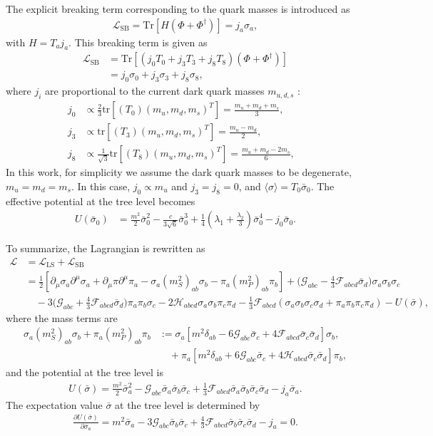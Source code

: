 \documentclass[a4paper,preprint,superscriptaddress,preprintnumbers,nofootinbib]{revtex4}
\newcommand{\al}[1]{\begin{align}#1\end{align}}
\newcommand{\nn}{\nonumber\\}
\newcommand{\p}{\partial}
\newcommand{\fn}[1]{\!\left(#1\right)}
\newcommand{\bra}{\langle}
\newcommand{\ket}{\rangle}
\newcommand{\Lag}{\mathcal L}
\newcommand{\tr}{\text{tr}}
\begin{document}
\begin{appendix}
The explicit breaking term corresponding to the quark masses is introduced as
\al{
\Lag_\text{SB} = \text{Tr}[H(\Phi +\Phi^\dagger)]=j_a\sigma_a,
}
with $H=T_a j_a$.
This breaking term is given as
\al{
\Lag_\text{SB} &= \text{Tr}\left[ \left(j_0T_0+j_3 T_3+j_8T_8 \right)\left(\Phi+\Phi^\dagger\right)\right]\nn
&=j_0\sigma_0+j_3\sigma_3+j_8\sigma_8,
}
where $j_i$ are proportional to the current dark quark masses $m_{u,d,s}$ :
\al{
j_0 &\propto \frac{2}{3}\tr[(T_0)(m_u, m_d, m_s)^T]=\frac{m_u+m_d+m_s}{3},&\\
j_3 &\propto \tr[(T_3)(m_u, m_d, m_s)^T]=\frac{m_u-m_d}{2},&\\
j_8 &\propto \frac{1}{\sqrt{3}} \tr[(T_8)(m_u, m_d, m_s)^T]=\frac{m_u+m_d-2m_s}{6},&
}
In this work, for simplicity we assume the dark quark masses to be degenerate, $m_u=m_d=m_s$.
In this case, $j_0\propto m_u$ and $j_3 =j_8=0$, and $\bra \sigma \ket=T_0\bar \sigma_0$.
The effective potential at the tree level becomes
\al{
U\fn{\bar \sigma_0}
&=\frac{m^2}{2}\bar \sigma_0^2
-\frac{c}{3\sqrt{6}}\bar \sigma_0^3
+\frac{1}{4}\left( \lambda_1 + \frac{\lambda_2}{3} \right){\bar \sigma}_0^4
-j_0\bar \sigma_0.
\label{tree level potential}
}

To summarize, the Lagrangian is rewritten as
\al{
\Lag&= 
\Lag_\text{LS}+\Lag_\text{SB}\nn
&=\frac{1}{2}[
\p_\mu \sigma_a \p^\mu \sigma_a
+\p_\mu \pi \p^\mu \pi_a
-\sigma_a(m^2_S)_{ab}\sigma_b 
- \pi_a(m^2_P)_{ab}\pi_b]
+\bigg({\mathcal G}_{abc}-\frac{4}{3}{\mathcal F}_{abcd}\bar \sigma_d\bigg) \sigma_a\sigma_b\sigma_c\nn
&\quad -3 \bigg({\mathcal G}_{abc}+\frac{4}{3}{\mathcal F}_{abcd}\bar \sigma_d\bigg)\pi_a\pi_b\sigma_c
-2{\mathcal H}_{abcd}\sigma_a\sigma_b\pi_c\pi_d-\frac{1}{3}{\mathcal F}_{abcd}(\sigma_a\sigma_b\sigma_c\sigma_d+\pi_a\pi_b\pi_c\pi_d)
-U\fn{\bar \sigma},
}
where the mass terms are
\al{
\sigma_a(m^2_S)_{ab}\sigma_b + \pi_a(m^2_P)_{ab}\pi_b&:=\sigma_a[m^2 \delta_{ab} -6{\mathcal G}_{abc}\bar \sigma_c+4{\mathcal F}_{abcd}\bar \sigma_c \bar \sigma_d]\sigma_b,\nn
&\quad+\pi_a[m^2 \delta_{ab} + 6{\mathcal G}_{abc}\bar \sigma_c+4{\mathcal H}_{abcd}\bar \sigma_c \bar \sigma_d]\pi_b,
}
and the potential at the tree level is
\al{
U\fn{\bar \sigma}=\frac{m^2}{2}\bar \sigma_a^2-{\mathcal G}_{abc}\bar \sigma_a\bar \sigma_b\bar \sigma_c +\frac{1}{3}{\mathcal F}_{abcd} \bar \sigma_a\bar \sigma_b\bar \sigma_c\bar \sigma_d -j_a\bar \sigma_a.
\label{generaltreepotential}
}
The expectation value $\bar \sigma$ at the tree level is determined by
\al{
\frac{\p U\fn{\bar \sigma}}{\p \bar \sigma_a}
=m^2 \bar \sigma_a -3{\mathcal G}_{abc}\bar\sigma_b\bar\sigma_c
+\frac{4}{3}{\mathcal F}_{abcd}\bar\sigma_b\bar\sigma_c\bar\sigma_d-j_a=0.
}


\end{appendix}
\end{document}
